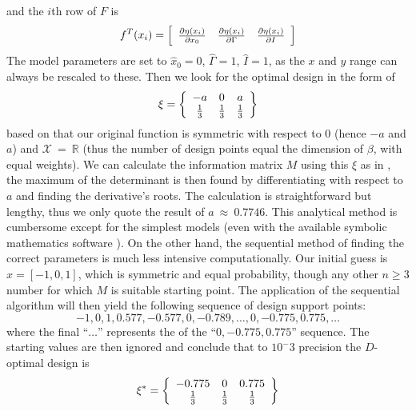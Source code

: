 \documentclass[12pt]{iopart}
\begin{document}
 and the $i$th row of $F$ is
\begin{equation}
 f^T(x_i) = \left[
  \begin{array}{l l l}
   \frac{\partial \eta(x_i)}{\partial x_0} & \frac{\partial \eta(x_i)}{\partial \Gamma} & \frac{\partial \eta(x_i)}{\partial I}
  \end{array} \right ]
\end{equation}
The model parameters are set to $\hat x_0 = 0$, $\hat \Gamma = 1$, $\hat I = 1$, as the $x$ and $y$ range can always be rescaled to these. Then we look for the optimal design in the form of
\begin{equation}
\xi = \left\{
  \begin{array}{c c c}
    -a & 0 & a\\
    \frac{1}{3} & \frac{1}{3} & \frac{1}{3}\\
  \end{array} \right \}
\end{equation}
based on that our original function is symmetric with respect to 0 (hence $-a$ and $a$) and $\mathcal{X}~=~\mathbb{R}$ (thus the number of design points equal the dimension of $\beta$, with equal weights). We can calculate the information matrix $M$ using this $\xi$ as in , the maximum of the determinant is then found by differentiating with respect to $a$ and finding the derivative's roots. The calculation is straightforward but lengthy, thus we only quote the result of $a~\approx~0.7746$. This analytical method is cumbersome except for the simplest models (even with the available symbolic mathematics software \cite{symmat}). On the other hand, the sequential method of finding the correct parameters is much less intensive computationally. Our initial guess is $x = [-1, 0, 1]$, which is symmetric and equal probability, though any other $n \geq 3$ number for which $M$ is suitable starting point. The application of the sequential algorithm will then yield the following sequence of design support points:
\begin{equation}
    -1, 0, 1, 0.577, -0.577, 0, -0.789,\ldots,0,-0.775,0.775,\ldots
\label{eq:l3seq}
\end{equation}
where the final ``$\ldots$'' represents the  of the ``$0,-0.775,0.775$'' sequence. The starting values are then ignored and conclude that to $10^-3$ precision the $D$-optimal design is
\begin{equation}
\xi^* = \left\{
  \begin{array}{c c c}
    -0.775 & 0 & 0.775\\
    \frac{1}{3} & \frac{1}{3} & \frac{1}{3}\\
  \end{array} \right \}
\label{eq:lorentzxi1}
\end{equation}
\end{document}
